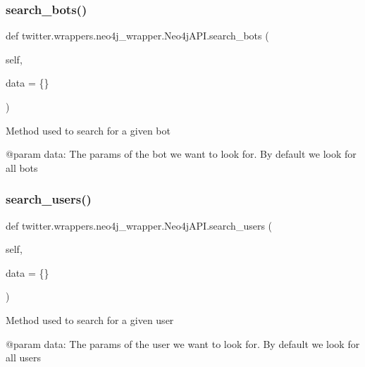 \subsubsection{\texorpdfstring{search\+\_\+bots()}{search\_bots()}}
{\footnotesize\ttfamily def twitter.\+wrappers.\+neo4j\+\_\+wrapper.\+Neo4j\+A\+P\+I.\+search\+\_\+bots (\begin{DoxyParamCaption}\item[{}]{self,  }\item[{}]{data = {\ttfamily \{\}} }\end{DoxyParamCaption})}

\begin{DoxyVerb}Method used to search for a given bot

@param data: The params of the bot we want to look for. By default we look for all bots
\end{DoxyVerb}
 \mbox{\label{classtwitter_1_1wrappers_1_1neo4j__wrapper_1_1Neo4jAPI_a267693caebe2e0e18ed479c8fc7369bf}} 
\subsubsection{\texorpdfstring{search\+\_\+users()}{search\_users()}}
{\footnotesize\ttfamily def twitter.\+wrappers.\+neo4j\+\_\+wrapper.\+Neo4j\+A\+P\+I.\+search\+\_\+users (\begin{DoxyParamCaption}\item[{}]{self,  }\item[{}]{data = {\ttfamily \{\}} }\end{DoxyParamCaption})}

\begin{DoxyVerb}Method used to search for a given user

@param data: The params of the user we want to look for. By default we look for all users
\end{DoxyVerb}
 \mbox{\label{classtwitter_1_1wrappers_1_1neo4j__wrapper_1_1Neo4jAPI_a15bc8d8d0b8752f6295ab8f1e5af6986}} 
